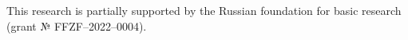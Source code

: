 This research is partially supported by the Russian foundation for basic research (grant № FFZF–2022–0004).
